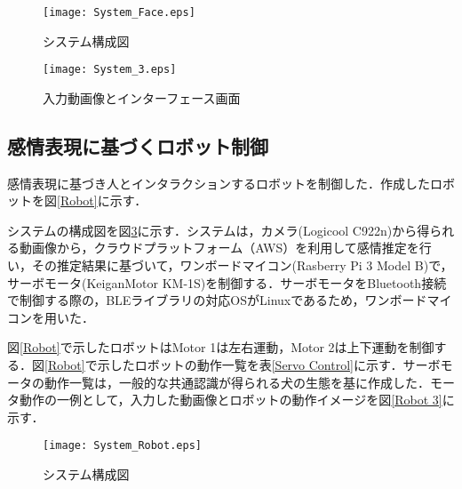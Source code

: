 \documentclass[titlepage]{jarticle}
\begin{document}
\begin{figure}[h]
\begin{center}
\texttt{[image: System\_Face.eps]}
\end{center}
\caption{システム構成図}
\label{System Face} %
\end{figure}

\begin{figure}[h]
\begin{center}
\texttt{[image: System\_3.eps]}
\end{center}
\caption{入力動画像とインターフェース画面}
\label{System 3} %
\end{figure}

\afterpage{\clearpage}
\newpage
\subsection{感情表現に基づくロボット制御}
感情表現に基づき人とインタラクションするロボットを制御した．作成したロボットを図\ref{Robot}に示す．

システムの構成図を図\ref{System Robot}に示す．システムは，カメラ(Logicool C922n)から得られる動画像から，クラウドプラットフォーム（AWS）を利用して感情推定を行い，その推定結果に基づいて，ワンボードマイコン(Rasberry Pi 3 Model B)で，サーボモータ(KeiganMotor KM-1S)を制御する．サーボモータをBluetooth接続で制御する際の，BLEライブラリの対応OSがLinuxであるため，ワンボードマイコンを用いた．

図\ref{Robot}で示したロボットはMotor 1は左右運動，Motor 2は上下運動を制御する．図\ref{Robot}で示したロボットの動作一覧を表\ref{Servo Control}に示す．サーボモータの動作一覧は，一般的な共通認識が得られる犬の生態を基に作成した．モータ動作の一例として，入力した動画像とロボットの動作イメージを図\ref{Robot 3}に示す．


\afterpage{\clearpage}

\begin{figure}[h]
\begin{center}
\texttt{[image: System\_Robot.eps]}
\end{center}
\caption{システム構成図}
\label{System Robot} %
\end{figure}
\end{document}

